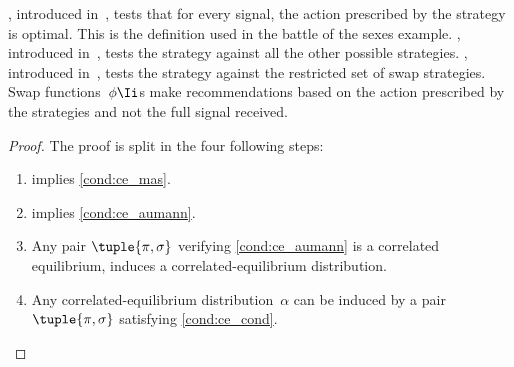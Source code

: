 , introduced in~\cite{aumann:1974}, tests that for every signal, the action prescribed by the strategy is optimal.
This is the definition used in the battle of the sexes example.
, introduced in~\cite{shoam_leyton-brown:2008}, tests the strategy against all the other possible strategies.
, introduced in~\cite{aumann:1987}, tests the strategy against the restricted set of swap strategies.
Swap functions~\(\phi\Ii\)s make recommendations based on the action prescribed by the strategies and not the full signal received.

\begin{proof}
The proof is split in the four following steps:
\begin{enumerate}
\item {} implies \cref{cond:ce_mas}.
\item {} implies \cref{cond:ce_aumann}.
\item Any pair \(\tuple{\pi, \sigma}\) verifying \cref{cond:ce_aumann} is a correlated equilibrium, \ie induces a correlated-equilibrium distribution.
\item Any correlated-equilibrium distribution~\(\alpha\) can be induced by a pair \(\tuple{\pi, \sigma}\) satisfying \cref{cond:ce_cond}.
\end{enumerate}


\end{proof}

